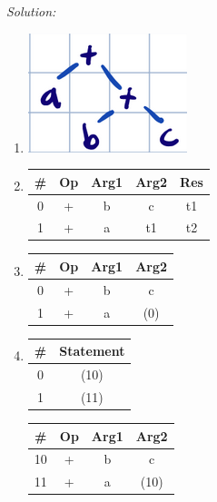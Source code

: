 \documentclass[a4paper, 11pt]{article}
\newenvironment{solution}
    {\textit{Solution:}}
    {}
\begin{document}
\begin{solution}
\begin{enumerate}[a]
    \item  \includegraphics{AST.png}
    \item
        \begin{tabular}{|| c c c c c ||}
            \hline
            \# & Op & Arg1 & Arg2 & Res \\ [0.5ex]
            \hline\hline
            0 & + & b & c & t1 \\
            \hline
            1 & + & a & t1 & t2 \\
            \hline
        \end{tabular}
    \item
        \begin{tabular}{|| c c c c||}
            \hline
            \# & Op & Arg1 & Arg2 \\ [0.5ex]
            \hline\hline
            0  & +  & b    & c\\
            \hline
            1  & +  & a    & (0)\\
            \hline
        \end{tabular}
    \item 
        \begin{tabular}{|| c c||}
            \hline
            \# & Statement \\ [0.5ex]
            \hline\hline
            0  & (10)  \\
            \hline
            1  & (11)   \\
            \hline
        \end{tabular}
        \begin{tabular}{|| c c c c||}
            \hline
            \# & Op & Arg1 & Arg2 \\ [0.5ex]
            \hline\hline
            10  & +  & b    & c    \\
            \hline
            11  & +  & a    & (10)  \\
            \hline
        \end{tabular}
\end{enumerate}
\end{solution} 
\end{document}
